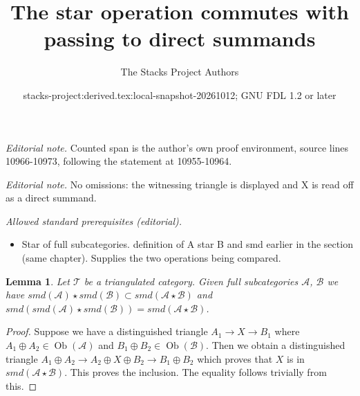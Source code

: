 \documentclass{stacks-project}
\title{The star operation commutes with passing to direct summands}
\author{The Stacks Project Authors}
\date{stacks-project:derived.tex:local-snapshot-20261012; GNU FDL 1.2 or later}
\theoremstyle{plain}
\newtheorem{lemma}[subsection]{Lemma}
\theoremstyle{definition}
\theoremstyle{remark}
\numberwithin{equation}{subsection}
\def\Ob{\mathop{\mathrm{Ob}}\nolimits}
\begin{document}
\maketitle
\noindent\textit{Editorial note.} Counted span is the author's own proof environment, source lines 10966-10973, following the statement at 10955-10964.\par\medskip
\noindent\textit{Editorial note.} No omissions: the witnessing triangle is displayed and X is read off as a direct summand.\par\medskip
\noindent\textit{Allowed standard prerequisites (editorial).}\begin{itemize}
\item Star of full subcategories. definition of A star B and smd earlier in the section (same chapter). Supplies the two operations being compared.
\end{itemize}\medskip
\begin{lemma}
\label{lemma-smd-star}
Let $\mathcal{T}$ be a triangulated category.
Given full subcategories $\mathcal{A}$, $\mathcal{B}$
we have
$smd(\mathcal{A}) \star smd(\mathcal{B}) \subset
smd(\mathcal{A} \star \mathcal{B})$ and
$smd(smd(\mathcal{A}) \star smd(\mathcal{B})) =
smd(\mathcal{A} \star \mathcal{B})$.
\end{lemma}

\begin{proof}
Suppose we have a distinguished triangle $A_1 \to X \to B_1$ where
$A_1 \oplus A_2 \in \Ob(\mathcal{A})$ and $B_1 \oplus B_2 \in \Ob(\mathcal{B})$.
Then we obtain a distinguished triangle
$A_1 \oplus A_2 \to A_2 \oplus X \oplus B_2 \to B_1 \oplus B_2$
which proves that $X$ is in $smd(\mathcal{A} \star \mathcal{B})$.
This proves the inclusion. The equality follows trivially from this.
\end{proof}
\end{document}
